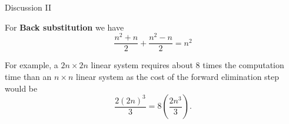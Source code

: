 \documentclass[12pt]{beamer}
\begin{document}
\begin{frame}{Discussion II}

For {\bf Back substitution} we have 
\[
\frac{n^2 + n}{2} + \frac{n^2-n}{2} = n^2 
\]


For example, a $2n \times 2n$ linear system requires about 8 times the computation time than an $n \times n$ linear system 
as the cost of the forward elimination step would be 
\[
\frac{2(2n)^3}{3} = 8(\frac{2n^3}{3}).
\]

\end{frame} 
\end{document}
